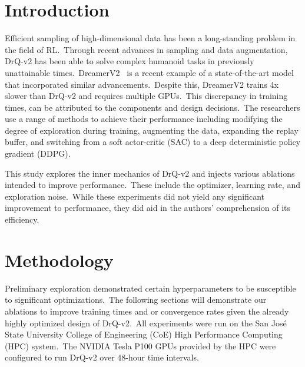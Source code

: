 \documentclass[conference]{./IEEEtran/IEEEtran} %
\begin{document}
    \section{Introduction}\label{sec:introduction}
    Efficient sampling of high-dimensional data has been a long-standing problem in the field of RL.\ Through recent advances in
    sampling and data augmentation, DrQ-v2 has been able to solve complex humanoid tasks in previously unattainable times.\
    DreamerV2~\cite{DreamerV2} is a recent example of a state-of-the-art model that incorporated similar advancements.\
    Despite this, DreamerV2 trains 4x slower than DrQ-v2 and requires multiple GPUs.\ This discrepancy in training
    times, can be attributed to the components and design decisions.\ The researchers use a range of methods to achieve their
    performance including modifying the degree of exploration during training, augmenting the data, expanding the
    replay buffer, and switching from a soft actor-critic (SAC) to a deep deterministic policy gradient (DDPG).\


    This study explores the inner mechanics of DrQ-v2 and injects various ablations intended to improve performance.\
    These include the optimizer, learning rate, and exploration noise.\ While these experiments did not yield any significant
    improvement to performance, they did aid in the authors' comprehension of its efficiency.

    \section{Methodology}\label{sec:methodology}

    Preliminary exploration demonstrated certain hyperparameters to be susceptible to significant optimizations.\ The following
    sections will demonstrate our ablations to improve training times and or convergence rates given the already highly optimized
    design of DrQ-v2.\ All experiments were run on the San Jos\'e State University College of Engineering (CoE) High Performance
    Computing (HPC) system.\ The NVIDIA Tesla P100 GPUs provided by the HPC were configured to run DrQ-v2 over 48-hour time intervals.
\end{document}
